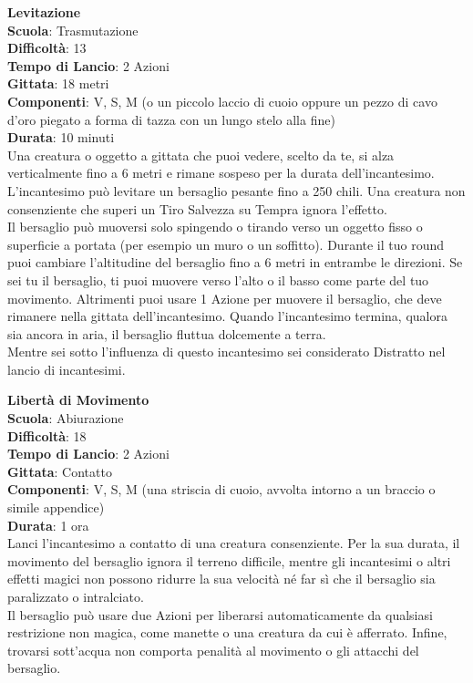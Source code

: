 \begin{multicols}{2}
\medskip\textbf{Levitazione}\\
\textbf{Scuola}: Trasmutazione\\
\textbf{Difficoltà}: 13\\
\textbf{Tempo di Lancio}: 2 Azioni\\
\textbf{Gittata}: 18 metri\\
\textbf{Componenti}: V, S, M (o un piccolo laccio di cuoio oppure un pezzo di cavo d'oro piegato a forma di tazza con un lungo stelo alla fine)\\
\textbf{Durata}: 10 minuti \\
Una creatura o oggetto a gittata che puoi vedere, scelto da te, si alza verticalmente fino a 6 metri e rimane sospeso per la durata dell'incantesimo. L'incantesimo può levitare un bersaglio pesante fino a 250 chili. Una creatura non consenziente che superi un Tiro Salvezza su Tempra ignora l'effetto.\\
Il bersaglio può muoversi solo spingendo o tirando verso un oggetto fisso o superficie a portata (per esempio un muro o un soffitto). Durante il tuo round puoi cambiare l'altitudine del bersaglio fino a 6 metri in entrambe le direzioni. Se sei tu il bersaglio, ti puoi muovere verso l'alto o il basso come parte del tuo movimento. Altrimenti puoi usare 1 Azione per muovere il bersaglio, che deve rimanere nella gittata dell'incantesimo. Quando l'incantesimo termina, qualora sia ancora in aria, il bersaglio fluttua dolcemente a terra.\\
Mentre sei sotto l'influenza di questo incantesimo sei considerato Distratto nel lancio di incantesimi.

\medskip\textbf{Libertà di Movimento}\\
\textbf{Scuola}: Abiurazione\\
\textbf{Difficoltà}: 18\\
\textbf{Tempo di Lancio}: 2 Azioni\\
\textbf{Gittata}: Contatto\\
\textbf{Componenti}: V, S, M (una striscia di cuoio, avvolta intorno a un braccio o simile appendice)\\
\textbf{Durata}: 1 ora\\
Lanci l'incantesimo a contatto di una creatura consenziente. Per la sua durata, il movimento del bersaglio ignora il terreno difficile, mentre gli incantesimi o altri effetti magici non possono ridurre la sua velocità né far sì che il bersaglio sia paralizzato o intralciato.\\
Il bersaglio può usare due Azioni per liberarsi automaticamente da qualsiasi restrizione non magica, come manette o una creatura da cui è afferrato. Infine, trovarsi sott'acqua non comporta penalità al movimento o gli attacchi del bersaglio. 


\end{multicols}
